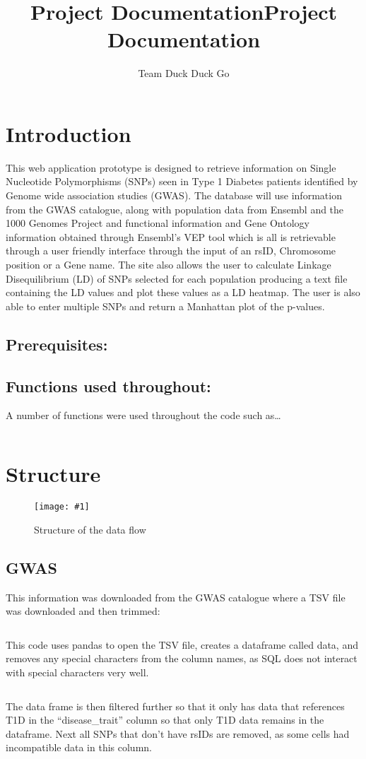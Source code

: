 \documentclass[12pt,a4paper]{article}
\title{Project Documentation}
\title{\huge \textbf{Project Documentation}}
\author{Team Duck Duck Go}
\date{} 					%
\newcommand{\sect}[1]{
\hypertarget{#1}{
\section{#1}\label{#1}}
}
\newcommand{\subsect}[1]{
\hypertarget{#1}{
\subsection{#1}\label{#1}}
}
\newcommand{\subsubsect}[1]{
\hypertarget{#1}{
\subsection{#1}\label{#1}}
}
\newcommand{\pic}[2]{
\begin{figure}[h]
    \centering
    \captionsetup{justification=centering}
    \texttt{[image: \#1]}
    \caption{#2}
    \label{#1}
\end{figure}
}
\begin{document}
\maketitle
\thispagestyle{empty}
\clearpage
\tableofcontents
\clearpage

\sect{Introduction} %


This web application prototype is designed to retrieve information on
Single Nucleotide Polymorphisms (SNPs) seen in Type 1 Diabetes patients
identified by Genome wide association studies (GWAS). The database will
use information from the GWAS catalogue, along with population data from
Ensembl and the 1000 Genomes Project and functional information and Gene
Ontology information obtained through Ensembl's VEP tool which is all is
retrievable through a user friendly interface through the input of an
rsID, Chromosome position or a Gene name. The site also allows the user
to calculate Linkage Disequilibrium (LD) of SNPs selected for each
population producing a text file containing the LD values and plot these
values as a LD heatmap. The user is also able to enter multiple SNPs and
return a Manhattan plot of the p-values.

\subsect{Prerequisites:}


\subsubsect{Functions used throughout:}

A number of functions were used throughout the code such as\ldots{}

\inputminted{python}{code_snippets/placeholder.py}

\sect{Structure}
\pic{structure}{Structure of the data flow}

\subsect{GWAS}

This information was downloaded from the GWAS catalogue where a TSV file was downloaded and then trimmed:

\inputminted{python}{code_snippets/placeholder.py}
This code uses pandas to open the TSV file, creates a dataframe called data, and removes any special characters from the column names, as SQL does not interact with special characters very well.

\inputminted{python}{code_snippets/placeholder.py}
The data frame is then filtered further so that it only has data that references T1D in the “disease\_trait” column so that only T1D data remains in the dataframe. Next all SNPs that don't have rsIDs are removed, as some cells had incompatible data in this column.
\end{document}
